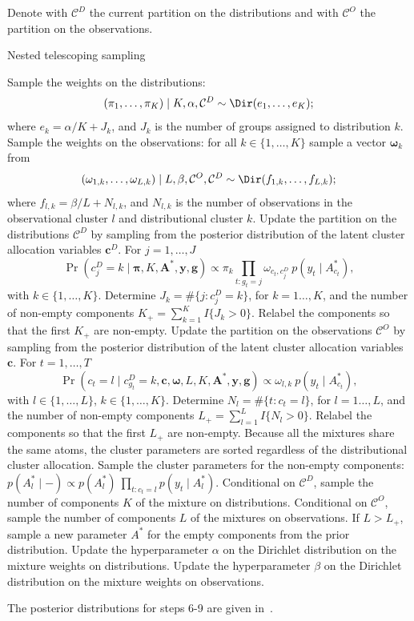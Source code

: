 \begin{algorithm}
	Denote with $\mathcal{C}^D$ the current partition on the distributions and with $\mathcal{C}^O$ the partition on the observations.
	\caption{Nested telescoping sampling}\label{ch3_alg:nested_telescopic}
	\begin{algorithmic}[1]
		\State Sample the weights on the distributions: $$(\pi_1,\dots,\pi_K)\mid K, \alpha, \mathcal{C}^D \sim \Dir(e_1, \dots, e_K);$$ where $e_k = \alpha/K + J_k$, and $J_k$ is the number of groups assigned to distribution $k$.
		\State Sample the weights on the observations: for all $k\in\{1,\dots,K\}$ sample a vector $\bm{\omega}_k$ from
		$$(\omega_{1,k},\dots,\omega_{L,k})\mid L, \beta, \mathcal{C}^O, \mathcal{C}^D \sim \Dir(f_{1,k}, \dots, f_{L,k});$$ where $f_{l,k} = \beta/L + N_{l,k}$, and $N_{l,k}$ is the number of observations in the observational cluster $l$ and distributional cluster $k$.
		\State Update the partition on the distributions $\mathcal{C}^D$ by sampling from the posterior distribution of the latent cluster allocation variables $\bm{c}^D$. For $j = 1,\dots,J$
		$$\Pr(c^D_j = k\mid \bm{\pi}, K,\bm{A}^*, \bm{y}, \bm{g}) \propto \pi_k \prod_{t:g_t=j} \omega_{c_t,c^D_j} \: p(y_t\mid A^*_{c_t}),$$
		with $k\in\{1,\dots,K\}$.
		Determine $J_k = \#\{j:c^D_j = k\}$, for $k=1\dots,K$, and the number of non-empty components $K_+ = \sum_{k=1}^K I\{ J_k > 0\}$. Relabel the components so that the first $K_+$ are non-empty.
		\State Update the partition on the observations $\mathcal{C}^O$ by sampling from the posterior distribution of the latent cluster allocation variables $\bm{c}$. For $t = 1,\dots,T$
		$$\Pr(c_t = l \mid c^D_{g_t}= k, \bm{c},\bm{\omega}, L,K,\bm{A}^*, \bm{y}, \bm{g}) \propto \omega_{l,k} \: p(y_t\mid A^*_{c_t}),$$
		with $l\in\{1,\dots,L\}$, $k\in\{1,\dots,K\}$.
		Determine $N_l = \#\{t:c_t = l\}$, for $l=1\dots,L$, and the number of non-empty components $L_+ = \sum_{l=1}^L I\{ N_l > 0\}$. Relabel the components so that the first $L_+$ are non-empty. Because all the mixtures share the same atoms, the cluster parameters are sorted regardless of the distributional cluster allocation.
		\State Sample the cluster parameters for the non-empty components: $ p(A^*_l\mid -)\propto p(A^*_l)\: \prod_{t:c_t = l} p(y_t\mid A^*_l) $.
		\State Conditional on $\mathcal{C}^D$, sample the number of components $K$ of the mixture on distributions.
		\State Conditional on $\mathcal{C}^O$, sample the number of components $L$ of the mixtures on observations. If $L > L_+$, sample a new parameter $A^*$ for the empty components from the prior distribution.
		\State Update the hyperparameter $\alpha$ on the Dirichlet distribution on the mixture weights on distributions.
		\State Update the hyperparameter $\beta$ on the Dirichlet distribution on the mixture weights on observations.
	\end{algorithmic}
The posterior distributions for steps 6-9 are given in~\citet{fruhwirthschnatter2020}.
\end{algorithm}


